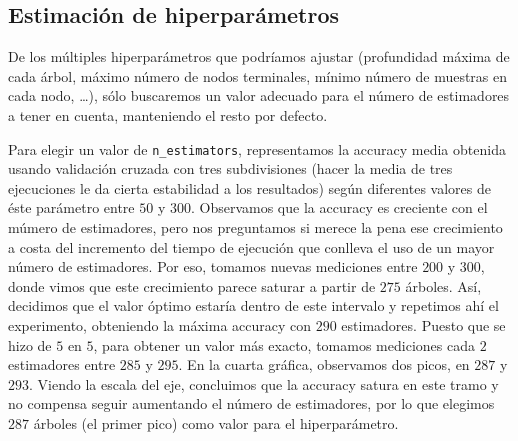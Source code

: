 \documentclass[a4]{article}
\begin{document}
\subsection{Estimación de hiperparámetros}

De los múltiples hiperparámetros que podríamos ajustar (profundidad
máxima de cada árbol, máximo número de nodos terminales, mínimo número
de muestras en cada nodo, \ldots), sólo buscaremos un valor adecuado
para el número de estimadores a tener en cuenta, manteniendo el resto
por defecto.

Para elegir un valor de \texttt{n\_estimators}, representamos la
accuracy media obtenida usando validación cruzada con tres
subdivisiones (hacer la media de tres ejecuciones le da cierta
estabilidad a los resultados) según diferentes valores de éste
parámetro entre $50$ y $300$. Observamos que la accuracy es
creciente con el múmero de estimadores, pero nos preguntamos si merece
la pena ese crecimiento a costa del incremento del tiempo de ejecución
que conlleva el uso de un mayor número de estimadores. Por eso,
tomamos nuevas mediciones entre $200$ y $300$, donde vimos que este
crecimiento parece saturar a partir de $275$ árboles. Así, decidimos
que el valor óptimo estaría dentro de este intervalo y repetimos ahí
el experimento, obteniendo la máxima accuracy con $290$
estimadores. Puesto que se hizo de $5$ en $5$, para obtener un valor
más exacto, tomamos mediciones cada $2$ estimadores entre $285$ y
$295$. En la cuarta gráfica, observamos dos picos, en $287$ y
$293$. Viendo la escala del eje, concluimos que la accuracy
satura en este tramo y no compensa seguir aumentando el número de
estimadores, por lo que elegimos $287$ árboles (el primer pico) como valor para el hiperparámetro.
\end{document}
